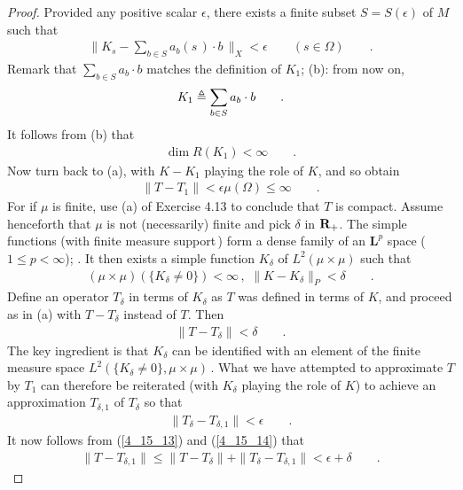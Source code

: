 \begin{proof}
% 
Provided any positive scalar $\epsilon$, there exists a finite subset $S=S(\epsilon)$ of $M$ such that
% 
\begin{align}
\| K_s - \sum_{b\in S} a_b(s\,) \cdot b\,\|_X < \epsilon \qquad  (s\in \Omega)\qquad .
\end{align}
% 
Remark that $\underset{b\in S}{\sum} a_b \cdot b$ matches the definition of $K_1$; \cf(b): from now on, 
% 
\begin{align}
K_1\triangleq \sum_{b\in S} a_b \cdot b\qquad .
\end{align}
% 
It follows from (b) that
% 
\begin{align}
\dim R(K_1) < \infty \qquad.
\end{align}
% 
Now turn back to (a), with $K-K_1$ playing the role of $K$, and so obtain
% 
\begin{align}
\|T-T_1\| < \epsilon \mu(\Omega)\leq \infty \qquad .
\end{align}
% 
For if $\mu$ is finite, use (a) of Exercise 4.13 to conclude that $T$ is compact. Assume henceforth that $\mu$ is not
(necessarily) finite and pick $\delta$ in $\mathbf{R}_+$. The simple functions (with finite measure support\,) form a dense family of
an $\symbf{L}^p$ space ($1\leq p<\infty$); \cf {}. It then exists a simple function $K_\delta$ of
$L^2(\mu\times \mu)$ such that
% 
\begin{align}
(\mu\times\mu)\left(\{K_\delta\neq 0\}\right) <\infty \,, \,\, \| K-K_\delta \|_P <\delta\qquad .
\end{align}
% 
Define an operator $T_\delta$ in terms of $K_\delta$ as $T$ was defined in terms of $K$, and proceed as in (a) with
$T-T_\delta$ instead of $T$. Then
% 
\begin{align}\label{4_15_13}
\|T-T_\delta\| < \delta\qquad .
\end{align}
% 
The key ingredient is that $K_\delta$ can be identified with an element of the finite measure space
$L^2(\{K_\delta\neq 0\},\mu\times\mu)\,$. What we have attempted to approximate $T$ by $T_1$ can therefore be reiterated
(with $K_\delta$ playing the role of $K$) to achieve an approximation $T_{\delta,1}$ of $T_\delta$ so that
% 
\begin{align}\label{4_15_14}
\|T_{\delta}-T_{\delta,1}\| < \epsilon\qquad .
\end{align}
% 
It now follows from (\ref{4_15_13}) and (\ref{4_15_14}) that
% 
\begin{align}
\|T-T_{\delta,1}\|\leq \|T-T_{\delta}\| +\|T_{\delta}-T_{\delta,1}\| < \epsilon+\delta\qquad .
\end{align}

\end{proof}
